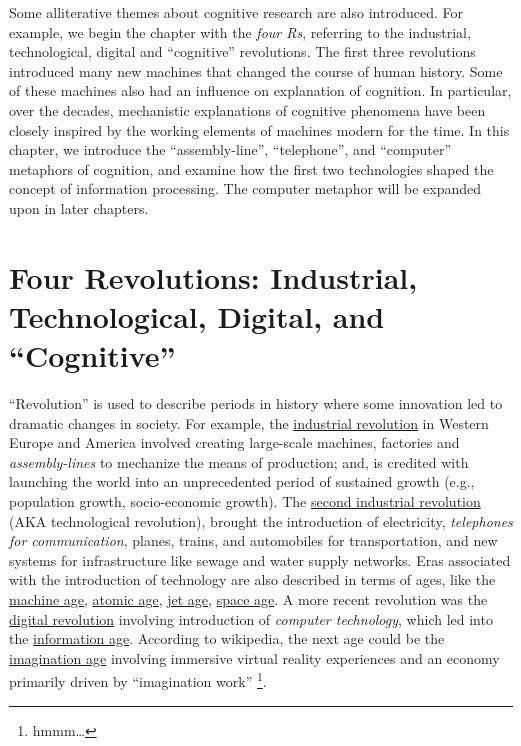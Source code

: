 \documentclass[
  oneside,
  12pt]{crumpbook}
\begin{document}
Some alliterative themes about cognitive research are also introduced. For example, we begin the chapter with the \emph{four Rs}, referring to the industrial, technological, digital and ``cognitive'' revolutions. The first three revolutions introduced many new machines that changed the course of human history. Some of these machines also had an influence on explanation of cognition. In particular, over the decades, mechanistic explanations of cognitive phenomena have been closely inspired by the working elements of machines modern for the time. In this chapter, we introduce the ``assembly-line'', ``telephone'', and ``computer'' metaphors of cognition, and examine how the first two technologies shaped the concept of information processing. The computer metaphor will be expanded upon in later chapters.

\hypertarget{four-revolutions-industrial-technological-digital-and-cognitive}{%
\section{Four Revolutions: Industrial, Technological, Digital, and ``Cognitive''}\label{four-revolutions-industrial-technological-digital-and-cognitive}}

``Revolution'' is used to describe periods in history where some innovation led to dramatic changes in society. For example, the \href{https://en.wikipedia.org/wiki/Industrial_Revolution}{industrial revolution} in Western Europe and America involved creating large-scale machines, factories and \emph{assembly-lines} to mechanize the means of production; and, is credited with launching the world into an unprecedented period of sustained growth (e.g., population growth, socio-economic growth). The \href{https://en.wikipedia.org/wiki/Second_Industrial_Revolution}{second industrial revolution} (AKA technological revolution), brought the introduction of electricity, \emph{telephones for communication}, planes, trains, and automobiles for transportation, and new systems for infrastructure like sewage and water supply networks. Eras associated with the introduction of technology are also described in terms of ages, like the \href{https://en.wikipedia.org/wiki/Machine_Age}{machine age}, \href{https://en.wikipedia.org/wiki/Atomic_Age}{atomic age}, \href{https://en.wikipedia.org/wiki/Jet_Age}{jet age}, \href{https://en.wikipedia.org/wiki/Space_Age}{space age}. A more recent revolution was the \href{https://en.wikipedia.org/wiki/Digital_Revolution}{digital revolution} involving introduction of \emph{computer technology}, which led into the \href{https://en.wikipedia.org/wiki/Information_Age}{information age}. According to wikipedia, the next age could be the \href{https://en.wikipedia.org/wiki/Imagination_age}{imagination age} involving immersive virtual reality experiences and an economy primarily driven by ``imagination work'' \footnote{hmmm\ldots{}}.
\end{document}
